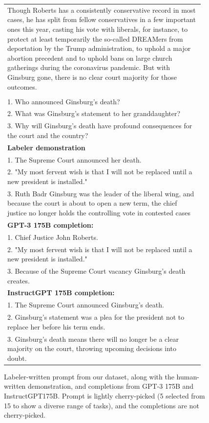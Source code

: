 \documentclass{article}
\begin{document}
\begin{figure}[hp]
\begin{tabular}{p{0.95\linewidth}}
Though Roberts has a consistently conservative record in most cases, he has split from fellow conservatives in a few important ones this year, casting his vote with liberals, for instance, to protect at least temporarily the so-called DREAMers from deportation by the Trump administration, to uphold a major abortion precedent and to uphold bans on large church gatherings during the coronavirus pandemic. But with Ginsburg gone, there is no clear court majority for those outcomes.\\\\
1. Who announced Ginsburg's death?\\
2. What was Ginsburg's statement to her granddaughter?\\
3. Why will Ginsburg's death have profound consequences for the court and the country?\\
\midrule
\textbf{Labeler demonstration}\\ 
1. The Supreme Court announced her death. \\
2. "My most fervent wish is that I will not be replaced until a new president is installed." \\
3. Ruth Badr Ginsburg was the leader of the liberal wing, and because the court is about to open a new term, the chief justice no longer holds the controlling vote in contested cases\\
\midrule 
        \textbf{GPT-3 175B completion:} \\
        1. Chief Justice John Roberts.\\
2. "My most fervent wish is that I will not be replaced until a new president is installed."\\
3. Because of the Supreme Court vacancy Ginsburg's death creates.\\
\midrule 
\textbf{InstructGPT 175B completion:} \\
1. The Supreme Court announced Ginsburg's death. \\
2. Ginsburg's statement was a plea for the president not to replace her before his term ends. \\
3. Ginsburg's death means there will no longer be a clear majority on the court, throwing upcoming decisions into doubt.\\
\bottomrule
    \end{tabular}
    \caption{Labeler-written prompt from our dataset, along with the human-written demonstration, and completions from GPT-3 175B and InstructGPT175B. Prompt is lightly cherry-picked (5 selected from 15 to show a diverse range of tasks), and the completions are not cherry-picked.}
    \label{fig:qual_labeler_3}
\end{figure}
\end{document}
